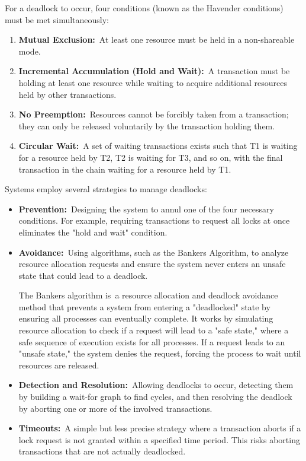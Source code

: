 \documentclass{scrbook}
\begin{document}
For a deadlock to occur, four conditions (known as the Havender
conditions) must be met simultaneously:

\begin{enumerate}
\item
  \textbf{Mutual Exclusion:}~At least one resource must be held in a
  non-shareable mode.
\item
  \textbf{Incremental Accumulation (Hold and Wait):}~A transaction must
  be holding at least one resource while waiting to acquire additional
  resources held by other transactions.
\item
  \textbf{No Preemption:}~Resources cannot be forcibly taken from a
  transaction; they can only be released voluntarily by the transaction
  holding them.
\item
  \textbf{Circular Wait:}~A set of waiting transactions exists such that
  T1 is waiting for a resource held by T2, T2 is waiting for T3, and so
  on, with the final transaction in the chain waiting for a resource
  held by T1.
\end{enumerate}

Systems employ several strategies to manage deadlocks:

\begin{itemize}
\item
  \textbf{Prevention:}~Designing the system to annul one of the four
  necessary conditions. For example, requiring transactions to request
  all locks at once eliminates the "hold and wait" condition.
\item
  \textbf{Avoidance:}~Using algorithms, such as the
  Banker\textquotesingle s Algorithm, to analyze resource allocation
  requests and ensure the system never enters an unsafe state that could
  lead to a deadlock.

  The Banker\textquotesingle s algorithm is~a resource allocation and
  deadlock avoidance method that prevents a system from entering a
  "deadlocked" state by ensuring all processes can eventually complete.
  It works by simulating resource allocation to check if a request will
  lead to a "safe state," where a safe sequence of execution exists for
  all processes. If a request leads to an "unsafe state," the system
  denies the request, forcing the process to wait until resources are
  released.
\item
  \textbf{Detection and Resolution:}~Allowing deadlocks to occur,
  detecting them by building a wait-for graph to find cycles, and then
  resolving the deadlock by aborting one or more of the involved
  transactions.
\item
  \textbf{Timeouts:}~A simple but less precise strategy where a
  transaction aborts if a lock request is not granted within a specified
  time period. This risks aborting transactions that are not actually
  deadlocked.
\end{itemize}
\end{document}
